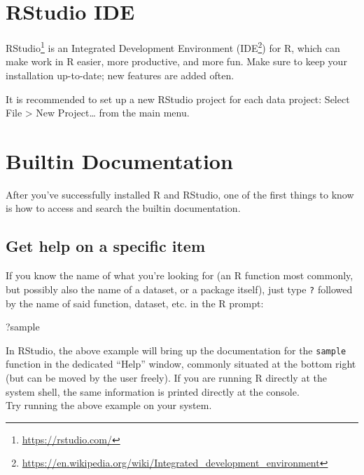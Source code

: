 \documentclass[
]{book}
\newenvironment{Shaded}{\begin{snugshade}}{\end{snugshade}}
\newcommand{\NormalTok}[1]{#1}
\DeclareRobustCommand{\href}[2]{#2\footnote{\url{#1}}}
\renewcommand{\href}[2]{#2\footnote{\url{#1}}}
\begin{document}
\hypertarget{rstudio-ide}{%
\section{RStudio IDE}\label{rstudio-ide}}

\href{https://rstudio.com/}{RStudio} is an Integrated Development Environment (\href{https://en.wikipedia.org/wiki/Integrated_development_environment}{IDE}) for R, which can make work in R easier, more productive, and more fun. Make sure to keep your installation up-to-date; new features are added often.

It is recommended to set up a new RStudio project for each data project: Select File \textgreater{} New Project\ldots{} from the main menu.

\hypertarget{builtin-documentation}{%
\section{Builtin Documentation}\label{builtin-documentation}}

After you've successfully installed R and RStudio, one of the first things to know is how to access and search the builtin documentation.

\hypertarget{get-help-on-a-specific-item}{%
\subsection{Get help on a specific item}\label{get-help-on-a-specific-item}}

If you know the name of what you're looking for (an R function most commonly, but possibly also the name of a dataset, or a package itself), just type \texttt{?} followed by the name of said function, dataset, etc. in the R prompt:

\begin{Shaded}
\begin{Highlighting}[]
\NormalTok{?sample}
\end{Highlighting}
\end{Shaded}

In RStudio, the above example will bring up the documentation for the \texttt{sample} function in the dedicated ``Help'' window, commonly situated at the bottom right (but can be moved by the user freely). If you are running R directly at the system shell, the same information is printed directly at the console.\\
Try running the above example on your system.
\end{document}
